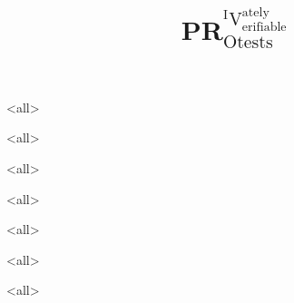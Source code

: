 \title[PRIVO\@: securely and PRIVately Verificable PROtests]{%
  PR$^{^{\text{I}}\text{V}^{\text{ately}}_\text{erifiable}}_{\text{Otests}}$%
}

\maketitle

\mode*

\begin{abstract}
  
\end{abstract}

\clearpage
\tableofcontents
\clearpage

\mode<all>{%

}

\mode<all>{%

}

\mode<all>{%

}


\mode<all>{%

}

\mode<all>{%

}

\mode<all>{%

}

\mode<all>{%

}



\begin{frame}[allowframebreaks]
  \printbibliography{}
\end{frame}
